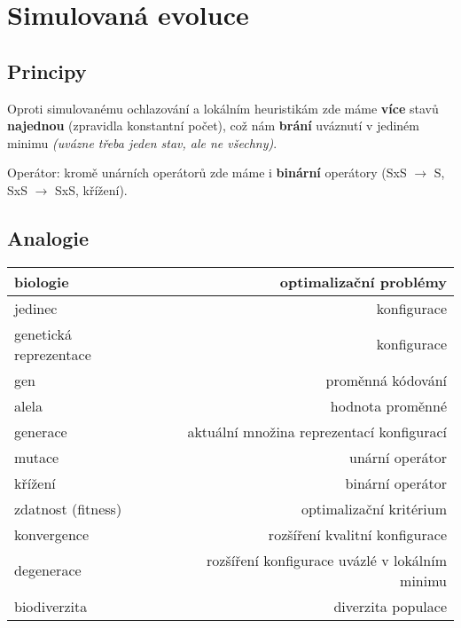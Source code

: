 \section{Simulovaná evoluce}

\subsection{Principy}

Oproti simulovanému ochlazování a lokálním heuristikám zde máme \textbf{více} stavů \textbf{najednou} (zpravidla konstantní počet), což nám \textbf{brání} uváznutí v jediném minimu \textit{(uvázne třeba jeden stav, ale ne všechny)}.

\vspace{4pt}
\noindent Operátor: kromě unárních operátorů zde máme i \textbf{binární} operátory (SxS $\to$ S, SxS $\to$ SxS, křížení).

\subsection{Analogie}

\begin{table}[H]
    \centering
    \begin{tabular}{|l|r|}
        \hline
        \textbf{biologie} & \textbf{optimalizační problémy} \\
        \hline
        jedinec & konfigurace \\
        \hline
        genetická reprezentace & konfigurace \\
        \hline
        gen & proměnná kódování \\
        \hline
        alela & hodnota proměnné \\
        \hline
        generace & aktuální množina reprezentací konfigurací \\
        \hline
        mutace & unární operátor \\
        \hline
        křížení & binární operátor \\
        \hline
        zdatnost (fitness) & optimalizační kritérium \\
        \hline
        konvergence & rozšíření kvalitní konfigurace \\
        \hline
        degenerace & rozšíření konfigurace uvázlé v lokálním minimu \\
        \hline
        biodiverzita & diverzita populace \\
        \hline
    \end{tabular}
\end{table}

